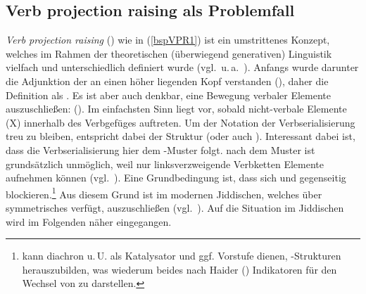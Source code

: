   \subsection {Verb projection raising als Problemfall}\label{vpr}
 \textit{Verb projection raising} (\hai{{\VPR}}) wie in (\ref{bspVPR1}) ist ein umstrittenes Konzept, welches im Rahmen der theoretischen (überwiegend generativen) Linguistik vielfach und unterschiedlich definiert wurde (vgl.\, u.\,a.\, \citealt{Evers1975,HaegemanRiemsdijk1986,Dikken1989,Dikken1994,Dikken1995,Dikken1996,Salzmann2011}). Anfangs wurde darunter die Adjunktion der  an einen höher liegenden Kopf verstanden (\citealt{Evers1975}), daher die Definition als . Es ist aber auch denkbar, eine Bewegung verbaler Elemente auszuschließen:  (\citealt[273]{Wurmbrand2006}). Im einfachsten Sinn liegt \hai{{\VPR}} vor, sobald nicht-verbale Elemente (X) innerhalb des Verbgefüges auftreten. Um der Notation der Verbserialisierung treu zu bleiben, entspricht \hai{{\VPR}} dabei der Struktur  (oder auch  ). Interessant dabei ist, dass die Verbserialisierung hier dem \hai{{\VO}}-Muster folgt. \hai{{\VPR}} nach dem Muster  ist grundsätzlich unmöglich, weil nur linksverzweigende Verbketten Elemente aufnehmen können (vgl.\, \citealt[273–276]{Schallert2014}). Eine Grundbedingung ist, dass sich \hai{{\VPR}} und  gegenseitig blockieren.\footnote{\hai{{\VPR}} kann diachron u.\,U. als Katalysator und ggf. Vorstufe dienen, -Strukturen herauszubilden, was wiederum beides nach Haider (\citeyear[125]{Haider2013}) Indikatoren für den Wechsel von \hai{{\OV}} zu \hai{{\VO}} darstellen.} Aus diesem Grund ist \hai{{\VPR}} im modernen Jiddischen, welches über symmetrisches  verfügt, auszuschließen (vgl.\, \citealt[68f]{Vikner2001}). Auf die Situation im Jiddischen wird im Folgenden näher eingegangen.  
  
 
